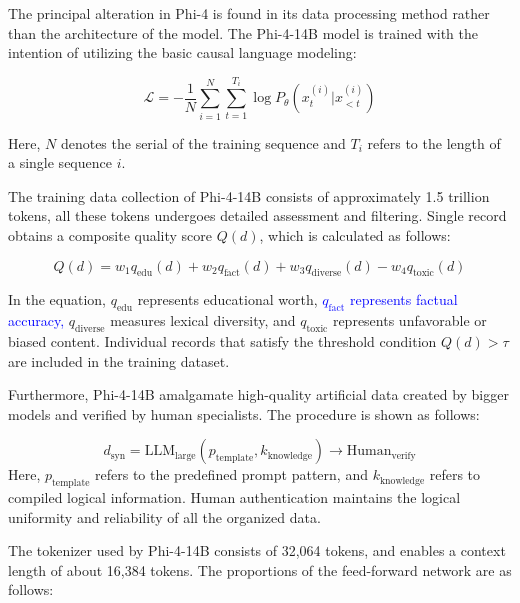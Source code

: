 \documentclass[10pt,letterpaper]{article}
\newcommand{\rev}[1]{\textcolor{blue}{#1}}
\begin{document}
The principal alteration in Phi-4 is found in its data processing method rather than the architecture of the model. The Phi-4-14B model is trained with the intention of utilizing the basic causal language modeling:

\begin{equation}
\mathcal{L} = -\frac{1}{N}\sum_{i=1}^{N}\sum_{t=1}^{T_i} \log P_\theta(x_t^{(i)} | x_{<t}^{(i)})
\label{eq:phi_loss}
\end{equation}

Here, \( N \) denotes the serial of the training sequence and \( T_i \) refers to the length of a single sequence \( i \).

The training data collection of Phi-4-14B consists of approximately 1.5 trillion tokens, all these tokens undergoes detailed assessment and filtering. Single record obtains a composite quality score \( Q(d) \), which is calculated as follows:

\begin{equation}
Q(d) = w_1 q_{\text{edu}}(d) + w_2 q_{\text{fact}}(d) + w_3 q_{\text{diverse}}(d) - w_4 q_{\text{toxic}}(d)
\label{eq:quality}
\end{equation}

In the equation, \( q_{\text{edu}} \) represents educational worth, \rev{\( q_{\text{fact}} \) represents factual accuracy,} \( q_{\text{diverse}} \) measures lexical diversity, and \( q_{\text{toxic}} \) represents unfavorable or biased content. Individual records that satisfy the threshold condition \( Q(d) > \tau \) are included in the training dataset.

Furthermore, Phi-4-14B amalgamate high-quality artificial data created by bigger models and verified by human specialists. The procedure is shown as follows:

\begin{equation}
d_{\text{syn}} = \text{LLM}_{\text{large}}(p_{\text{template}}, k_{\text{knowledge}}) \rightarrow \text{Human}_{\text{verify}}
\label{eq:synthetic}
\end{equation}
Here, \( p_{\text{template}} \) refers to the predefined prompt pattern, and \( k_{\text{knowledge}} \) refers to compiled logical information. Human authentication maintains the logical uniformity and reliability of all the organized data.

The tokenizer used by Phi-4-14B consists of 32,064 tokens, and enables a context length of about 16,384 tokens. The proportions of the feed-forward network are as follows:
\end{document}
